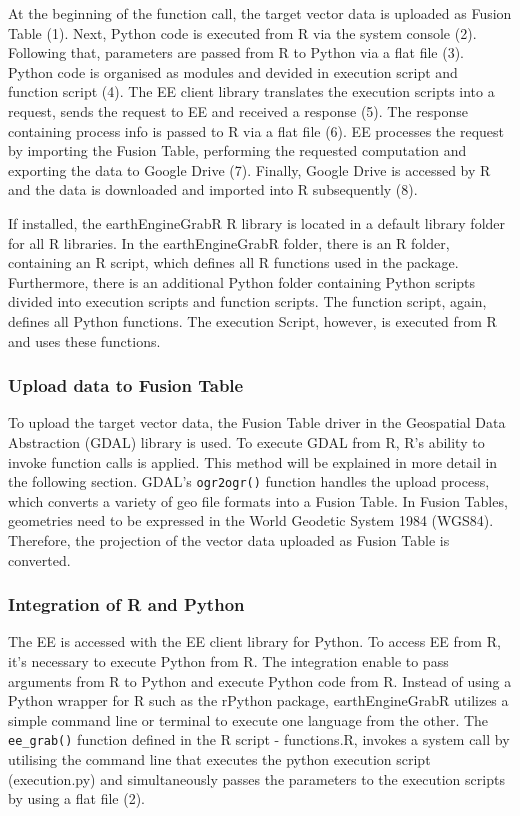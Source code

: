 At the beginning of the function call, the target vector data is uploaded as Fusion Table (1). Next, Python code is executed from R via the system console (2). 
Following that, parameters are passed from R to Python via a flat file (3). Python code is organised as modules and devided in execution script and function script (4). The EE client library translates the execution scripts into a request, sends the request to EE  and received a response (5). The response containing process info is passed to R via a flat file (6). EE processes the request by importing the Fusion Table, performing the requested computation and exporting the data to Google Drive (7).
Finally, Google Drive is accessed by R and the data is downloaded and imported into R subsequently (8).

If installed, the earthEngineGrabR R library is located in a default library folder for all R libraries. In the earthEngineGrabR folder, there is an R folder, containing an R script, which defines all R functions used in the package. Furthermore, there is an additional Python folder containing Python scripts divided into execution scripts and function scripts. The function script, again, defines all Python functions. The execution Script, however, is executed from R and uses these functions.

\subsubsection{Upload data to Fusion Table}

To upload the target vector data, the Fusion Table driver in the Geospatial Data Abstraction (GDAL) library is used. To execute GDAL from R, R's ability to invoke function calls is applied. This method will be explained in more detail in the following section. GDAL's \texttt{ogr2ogr()}  function handles the upload process, which converts a variety of geo file formats into a Fusion Table. In Fusion Tables, geometries need to be expressed in the World Geodetic System 1984 (WGS84). Therefore, the projection of the vector data uploaded as Fusion Table is converted.

\subsubsection{Integration of R and Python}

The EE is accessed with the EE client library for Python. To access EE from R, it's necessary to execute Python from R. The integration enable to pass arguments from R to Python and execute Python code from R. Instead of using a Python wrapper for R such as the rPython package, earthEngineGrabR utilizes a simple command line or terminal to execute one language from the other. The \texttt{ee\_grab()} function defined in the R script - functions.R, invokes a system call by utilising the command line that executes the python execution script (execution.py) and simultaneously passes the parameters to the execution scripts by using a flat file (2). 

